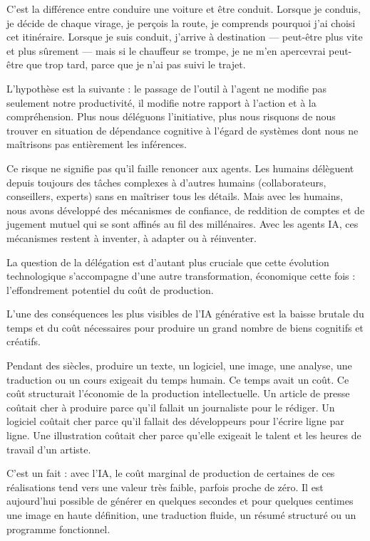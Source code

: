C'est la différence entre conduire une voiture et être conduit. Lorsque je conduis, je décide de chaque virage, je perçois la route, je comprends pourquoi j'ai choisi cet itinéraire. Lorsque je suis conduit, j'arrive à destination — peut-être plus vite et plus sûrement — mais si le chauffeur se trompe, je ne m'en apercevrai peut-être que trop tard, parce que je n'ai pas suivi le trajet.

L'hypothèse est la suivante : le passage de l'outil à l'agent ne modifie pas seulement notre productivité, il modifie notre rapport à l'action et à la compréhension. Plus nous déléguons l'initiative, plus nous risquons de nous trouver en situation de dépendance cognitive à l'égard de systèmes dont nous ne maîtrisons pas entièrement les inférences.

Ce risque ne signifie pas qu'il faille renoncer aux agents. Les humains délèguent depuis toujours des tâches complexes à d'autres humains (collaborateurs, conseillers, experts) sans en maîtriser tous les détails. Mais avec les humains, nous avons développé des mécanismes de confiance, de reddition de comptes et de jugement mutuel qui se sont affinés au fil des millénaires. Avec les agents IA, ces mécanismes restent à inventer, à adapter ou à réinventer.

La question de la délégation est d'autant plus cruciale que cette évolution technologique s'accompagne d'une autre transformation, économique cette fois : l'effondrement potentiel du coût de production.


L'une des conséquences les plus visibles de l'IA générative est la baisse brutale du temps et du coût nécessaires pour produire un grand nombre de biens cognitifs et créatifs.

Pendant des siècles, produire un texte, un logiciel, une image, une analyse, une traduction ou un cours exigeait du temps humain. Ce temps avait un coût. Ce coût structurait l'économie de la production intellectuelle. Un article de presse coûtait cher à produire parce qu'il fallait un journaliste pour le rédiger. Un logiciel coûtait cher parce qu'il fallait des développeurs pour l'écrire ligne par ligne. Une illustration coûtait cher parce qu'elle exigeait le talent et les heures de travail d'un artiste.

C'est un fait : avec l'IA, le coût marginal de production de certaines de ces réalisations tend vers une valeur très faible, parfois proche de zéro. Il est aujourd'hui possible de générer en quelques secondes et pour quelques centimes une image en haute définition, une traduction fluide, un résumé structuré ou un programme fonctionnel.


